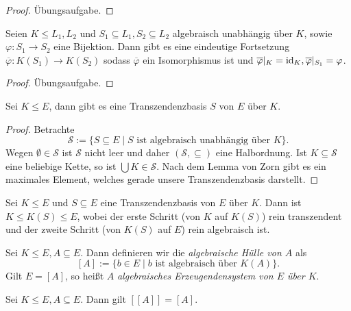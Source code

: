 \begin{proof}
    Übungsaufgabe.
\end{proof}

\begin{proposition}
    Seien $K \leq L_1, L_2$ und $S_1 \subseteq L_1, S_2 \subseteq L_2$ algebraisch unabhängig über $K$, sowie $\varphi : S_1 \to S_2$ eine Bijektion. Dann gibt es eine eindeutige Fortsetzung $\overline{\varphi} : K(S_1) \to K(S_2)$ sodass $\overline{\varphi}$ ein Isomorphismus ist und $\overline{\varphi} \vert_K = \operatorname{id}_K, \overline{\varphi} \vert_{S_1} = \varphi$.
\end{proposition}

\begin{proof}
    Übungsaufgabe.
\end{proof}

\begin{proposition}
    Sei $K \leq E$, dann gibt es eine Transzendenzbasis $S$ von $E$ über $K$.
\end{proposition}

\begin{proof}
    Betrachte
    $$ \mathcal{S} := \{ S \subseteq E \mid S \text{ ist algebraisch unabhängig über } K \}. $$
    Wegen $\emptyset\in\mathcal{S}$ ist $\mathcal{S}$ nicht leer und daher $(\mathcal{S}, \subseteq)$ eine Halbordnung. Ist $K \subseteq \mathcal{S}$ eine beliebige Kette, so ist $\bigcup K \in \mathcal{S}$. Nach dem Lemma von Zorn gibt es ein maximales Element, welches gerade unsere Transzendenzbasis darstellt.
\end{proof}

\begin{corollary}
    Sei $K \leq E$ und $S \subseteq E$ eine Transzendenzbasis von $E$ über $K$. Dann ist $K \leq K(S) \leq E$, wobei der erste Schritt (von $K$ auf $K(S)$) rein transzendent und der zweite Schritt (von $K(S)$ auf $E$) rein algebraisch ist.
\end{corollary}

\begin{definition}
    Sei $K \leq E, A \subseteq E$. Dann definieren wir die \emph{algebraische Hülle von $A$} als
    $$ [A] := \{ b \in E \mid b \text{ ist algebraisch über } K(A) \}. $$
    Gilt $E = [A]$, so heißt $A$ \emph{algebraisches Erzeugendensystem von $E$ über $K$}.
\end{definition}

\begin{lemma}
    Sei $K \leq E, A \subseteq E$. Dann gilt $[[A]] = [A]$.
\end{lemma}

